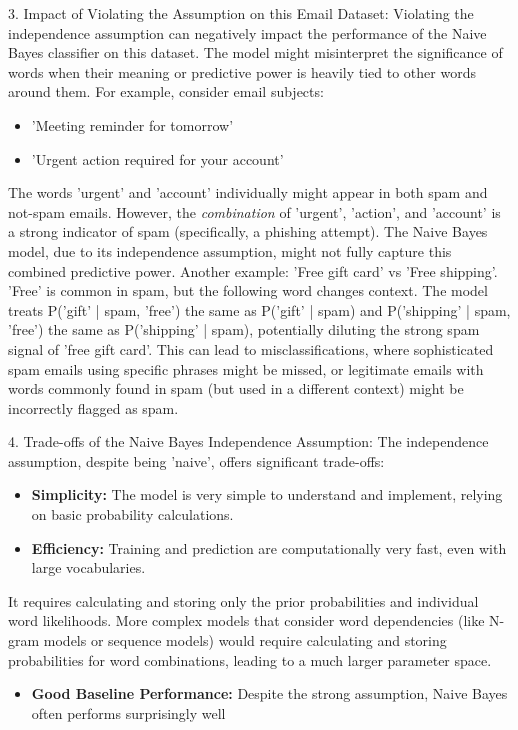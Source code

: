 \documentclass[12pt,a4paper]{article}
\begin{document}
3. Impact of Violating the Assumption on this Email Dataset:
   Violating the independence assumption can negatively impact the performance of
   the Naive Bayes classifier on this dataset. The model might misinterpret the
   significance of words when their meaning or predictive power is heavily tied
   to other words around them.
   For example, consider email subjects:
\begin{itemize}
    \item 'Meeting reminder for tomorrow'
    \item 'Urgent action required for your account'
\end{itemize}

   The words 'urgent' and 'account' individually might appear in both spam and not-spam
   emails. However, the \textit{combination} of 'urgent', 'action', and 'account' is a strong
   indicator of spam (specifically, a phishing attempt). The Naive Bayes model, due to
   its independence assumption, might not fully capture this combined predictive power.
   Another example: 'Free gift card' vs 'Free shipping'. 'Free' is common in spam, but the following word changes context.
   The model treats P('gift' | spam, 'free') the same as P('gift' | spam) and P('shipping' | spam, 'free')
   the same as P('shipping' | spam), potentially diluting the strong spam signal of 'free gift card'.
   This can lead to misclassifications, where sophisticated spam emails using specific phrases
   might be missed, or legitimate emails with words commonly found in spam (but used in a different context)
   might be incorrectly flagged as spam.

4. Trade-offs of the Naive Bayes Independence Assumption:
   The independence assumption, despite being 'naive', offers significant trade-offs:
\begin{itemize}
    \item \textbf{Simplicity:} The model is very simple to understand and implement, relying on basic probability calculations.
    \item \textbf{Efficiency:} Training and prediction are computationally very fast, even with large vocabularies.
\end{itemize}

     It requires calculating and storing only the prior probabilities and individual word likelihoods.
     More complex models that consider word dependencies (like N-gram models or sequence models)
     would require calculating and storing probabilities for word combinations, leading to a much larger parameter space.
\begin{itemize}
    \item \textbf{Good Baseline Performance:} Despite the strong assumption, Naive Bayes often performs surprisingly well
\end{itemize}
\end{document}
